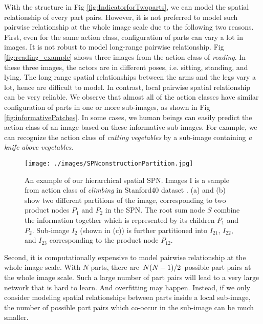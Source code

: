 \documentclass[journal]{IEEEtran}
\begin{document}
With the structure in Fig \ref{fig:IndicatorforTwoparts}, we can model the spatial relationship of every part pairs.
However, it is not preferred to model such pairwise relationship at the whole image scale due to the following two reasons. First, even for the same action class, configuration of parts can vary a lot in images. It is not robust to model long-range pairwise relationship. Fig \ref{fig:reading_example} shows three images from the action class of \textit{reading}. In these three images, the actors are in different poses, i.e. sitting, standing, and lying. The long range spatial relationships between the arms and the legs vary a lot, hence are difficult to model.
In contrast, local pairwise spatial relationship can be very reliable. We observe that almost all of the action classes have similar configuration of parts in one or more sub-images, as shown in Fig \ref{fig:informativePatches}.  In some cases, we human beings can easily predict the action class of an image based on these informative sub-images. For example, we can recognize the action class of
\textit{cutting vegetables} by a sub-image containing \textit{a knife above vegetables}.





\begin{figure*}[htb]
	\begin{center}
		\texttt{[image: ./images/SPNconstructionPartition.jpg]}
	\end{center}
	\caption{An example of our hierarchical spatial SPN. Images I is a sample from action class of \textit{climbing} in Stanford40 dataset \cite{Yao11humanaction__Stanford40}. (a) and (b) show two different partitions of the image, corresponding to two product nodes $ P_1 $ and $ P_2 $  in the SPN. The root sum node $ S $ combine the information together which is represented by its children $ P_1 $ and $ P_2 $. Sub-image $ I_2 $ (shown in (c)) is further partitioned into $ I_{21} $, $ I_{22} $, and $ I_{23} $ corresponding to the product node $ P_{12} $.}
	\label{fig:SPNconstructionPartition}
\end{figure*}





Second, it is computationally expensive to model pairwise relationship at the whole image scale.
With $ N $ parts, there are $\left.N(N-1)\middle/2\right. $ possible part pairs at the whole image scale.
Such a large number of part pairs will lead to a very large network that is hard to learn. And overfitting may happen. Instead, if we only consider modeling spatial relationships between parts inside a local sub-image, the number of possible part pairs which co-occur in the sub-image can be much smaller.
\end{document}
